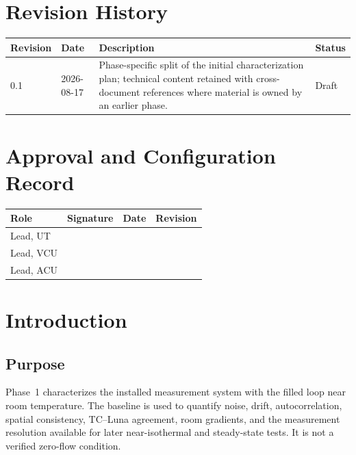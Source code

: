 \documentclass[11pt]{article}
\begin{document}
\clearpage
{}
\section*{Revision History}
\begin{tabularx}{\textwidth}{@{}p{0.75in}p{1.2in}>{\raggedright\arraybackslash}X>{\raggedright\arraybackslash}p{1.15in}@{}}
\toprule
\textbf{Revision} & \textbf{Date} & \textbf{Description} & \textbf{Status} \\
\midrule
0.1 & 2026-08-17 & Phase-specific split of the initial characterization plan; technical content retained with cross-document references where material is owned by an earlier phase. & Draft \\
\bottomrule
\end{tabularx}

\vspace{0.25in}
\section*{Approval and Configuration Record}
\begin{tabularx}{\textwidth}{@{}p{1.55in}X p{1.25in}p{1.05in}@{}}
\toprule
\textbf{Role} & \textbf{Signature} & \textbf{Date} & \textbf{Revision} \\
\midrule
Lead, UT & & & \\
Lead, VCU & & & \\
Lead, ACU & & & \\
\bottomrule
\end{tabularx}
\clearpage
\tableofcontents
\clearpage
{}

\section{Introduction}
\label{sec:introduction}
\subsection{Purpose}
Phase~1 characterizes the installed measurement system with the filled loop near room temperature. The baseline is used to quantify noise, drift, autocorrelation, spatial consistency, TC--Luna agreement, room gradients, and the measurement resolution available for later near-isothermal and steady-state tests. It is not a verified zero-flow condition.
\end{document}
